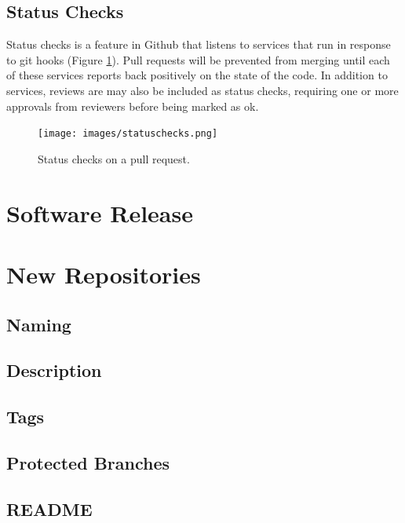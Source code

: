 \documentclass[a4paper,12pt,titlepage]{scrartcl}
\begin{document}
	\subsection{Status Checks}
	
	Status checks is a feature in Github that listens to services that run in response to git hooks (Figure \ref{fig:statuschecks}).
	Pull requests will be prevented from merging until each of these services reports back positively on the state of the code.
	In addition to services, reviews are may also be included as status checks, requiring one or more approvals from reviewers before being marked as ok.
   
   	\begin{figure}
  		\centering
    		\texttt{[image: images/statuschecks.png]}
    		\caption{Status checks on a pull request.}
    		\label{fig:statuschecks}
   	\end{figure}
   	
   	\pagebreak
   	
	\section{Software Release}
	
	\section{New Repositories}
	
	\subsection{Naming}
	
	\subsection{Description}
	
	\subsection{Tags}
	
	\subsection{Protected Branches}
	
	\subsection{README}
	
\end{document}
